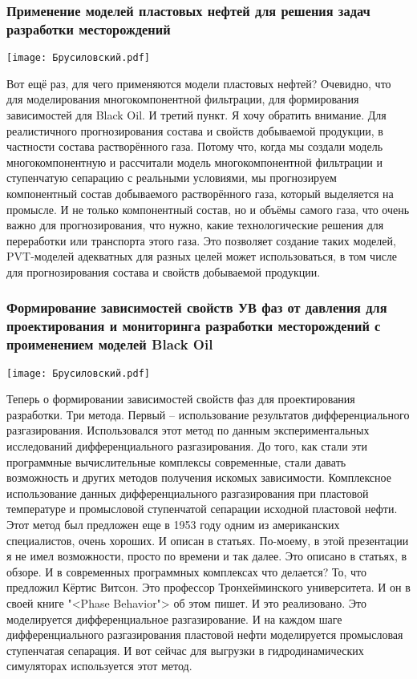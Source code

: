 \documentclass[main.tex]{subfiles}
\begin{document}
\subsubsection{Применение моделей пластовых нефтей для решения задач разработки месторождений}

\begin{center}
\texttt{[image: Брусиловский.pdf]}
\end{center}

Вот ещё раз, для чего применяются модели пластовых нефтей?
Очевидно, что для моделирования многокомпонентной фильтрации, для формирования зависимостей для Black Oil.
И третий пункт.
Я хочу обратить внимание.
Для реалистичного прогнозирования состава и свойств добываемой продукции, в частности состава растворённого газа.
Потому что, когда мы создали модель многокомпонентную и рассчитали модель многокомпонентной фильтрации и ступенчатую сепарацию с реальными условиями, мы прогнозируем компонентный состав добываемого растворённого газа, который выделяется на промысле.
И не только компонентный состав, но и объёмы самого газа, что очень важно для прогнозирования, что нужно, какие технологические решения для переработки или транспорта этого газа.
Это позволяет создание таких моделей, PVT-моделей адекватных для разных целей может использоваться, в том числе для прогнозирования состава и свойств добываемой продукции.

\subsubsection{Формирование зависимостей свойств УВ фаз от давления для проектирования и мониторинга разработки месторождений с проименением моделей Black Oil}

\begin{center}
\texttt{[image: Брусиловский.pdf]}
\end{center}

Теперь о формировании зависимостей свойств фаз для проектирования разработки.
Три метода.
Первый -- использование результатов дифференциального разгазирования.
Использовался этот метод по данным экспериментальных исследований дифференциального разгазирования.
До того, как стали эти программные вычислительные комплексы современные, стали давать возможность и других методов получения искомых зависимости.
Комплексное использование данных дифференциального разгазирования при пластовой температуре и промысловой ступенчатой сепарации исходной пластовой нефти.
Этот метод был предложен еще в 1953 году одним из американских специалистов, очень хороших.
И описан в статьях.
По-моему, в этой презентации я не имел возможности, просто по времени и так далее.
Это описано в статьях, в обзоре.
И в современных программных комплексах что делается?
То, что предложил Кёртис Витсон.
Это профессор Тронхейминского университета.
И он в своей книге "<Phase Behavior"> об этом пишет.
И это реализовано.
Это моделируется дифференциальное разгазирование.
И на каждом шаге дифференциального разгазирования пластовой нефти моделируется промысловая ступенчатая сепарация.
И вот сейчас для выгрузки в гидродинамических симуляторах используется этот метод.
\end{document}
